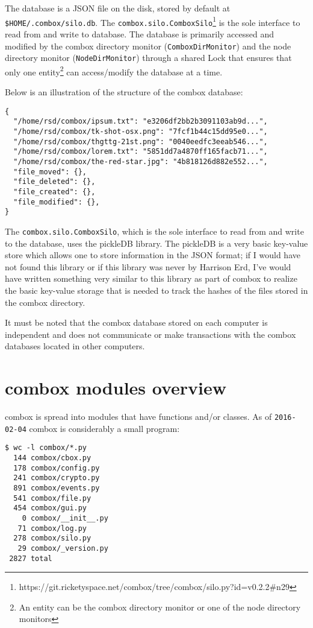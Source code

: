The database is a JSON file on the disk, stored by default at
\verb+$HOME/.combox/silo.db+. The
\verb+combox.silo.ComboxSilo+\footnote{https://git.ricketyspace.net/combox/tree/combox/silo.py?id=v0.2.2\#n29}
is the sole interface to read from and write to database. The database
is primarily accessed and modified by the combox directory monitor
(\verb+ComboxDirMonitor+) and the node directory monitor
(\verb+NodeDirMonitor+) through a shared Lock that ensures that only
one entity\footnote{An entity can be the combox directory monitor or
  one of the node directory monitors} can access/modify the database
at a time.

Below is an illustration of the structure of the combox database:

\begin{verbatim}
{
  "/home/rsd/combox/ipsum.txt": "e3206df2bb2b3091103ab9d...",
  "/home/rsd/combox/tk-shot-osx.png": "7fcf1b44c15dd95e0...",
  "/home/rsd/combox/thgttg-21st.png": "0040eedfc3eeab546...",
  "/home/rsd/combox/lorem.txt": "5851dd7a4870ff165facb71...",
  "/home/rsd/combox/the-red-star.jpg": "4b818126d882e552...",
  "file_moved": {},
  "file_deleted": {},
  "file_created": {},
  "file_modified": {},
}
\end{verbatim}

The \verb+combox.silo.ComboxSilo+, which is the sole interface to read
from and write to the database, uses the pickleDB
library\cite{pylib:pickledb}. The pickleDB is a very basic key-value
store which allows one to store information in the JSON format; if I
would have not found this library or if this library was never by
Harrison Erd, I've would have written something very similar to this
library as part of combox to realize the basic key-value storage that
is needed to track the hashes of the files stored in the combox
directory.

It must be noted that the combox database stored on each computer is
independent and does not communicate or make transactions with the
combox databases located in other computers.

\section{combox modules overview}

combox is spread into modules that have functions and/or classes. As
of \verb+2016-02-04+ combox is considerably a small program:

\begin{verbatim}
$ wc -l combox/*.py
  144 combox/cbox.py
  178 combox/config.py
  241 combox/crypto.py
  891 combox/events.py
  541 combox/file.py
  454 combox/gui.py
    0 combox/__init__.py
   71 combox/log.py
  278 combox/silo.py
   29 combox/_version.py
 2827 total
\end{verbatim}

